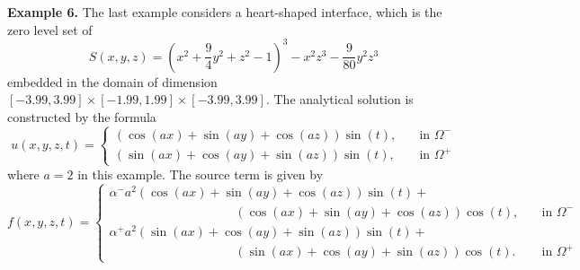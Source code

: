 \documentclass[dissertation]{uathesis}
\begin{document}
\begin{body}
\begin{flushleft}
{\flushleft \bf Example 6.} The last example considers a heart-shaped interface,
which is the zero level set of 
%
\begin{equation}
S(x,y,z) = (x^{2}+\frac{9}{4}y^{2}+z^{2}-1)^{3}-x^{2}z^{3}-\frac{9}{80}y^{2}z^{3}
\end{equation}
%
embedded in the domain of dimension $[-3.99,3.99]\times[-1.99,1.99]\times[-3.99,3.99]$. The analytical solution is constructed by the formula
% 
\begin{equation} \label{analytical_eqn_3} 
u(x,y,z,t)= 
\begin{cases}
(\cos(ax)+\sin(ay)+\cos(az))\sin(t), \quad   &\mbox{in } \Omega^{-} \\
(\sin(ax)+\cos(ay)+\sin(az))\sin(t), \quad   &\mbox{in } \Omega^{+}
\end{cases}
\end{equation}
%
where $a=2$ in this example. The source term is given by
% 
\begin{equation} 
f(x,y,z,t)= 
\begin{cases}
\alpha^{-} a^{2}(\cos(ax)+\sin(ay)+\cos(az))\sin(t)+ \\
\quad \quad \quad \quad \quad \quad \quad \quad \quad \quad (\cos(ax)+\sin(ay)+\cos(az))\cos(t), \quad   &\mbox{in } \Omega^{-} \\
\alpha^{+} a^{2}(\sin(ax)+\cos(ay)+\sin(az))\sin(t)+ \\
\quad \quad \quad \quad \quad \quad \quad \quad \quad \quad (\sin(ax)+\cos(ay)+\sin(az))\cos(t). \quad    &\mbox{in } \Omega^{+}
\end{cases}
\end{equation}
\label{source_eqn_3}
%


\end{flushleft}
\end{body}
\end{document}

